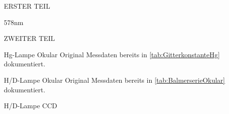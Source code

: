 \begin{appendix}
\begin{chapter}{ERSTER TEIL}
      \begin{section}{578nm}
        \label{Anhang:chp:ERSTERTEIL:sec:578}
      
      
      
      \end{section}
     
    \end{chapter}
    
    
    
    \begin{chapter}{ZWEITER TEIL}
      \label{Anhang:chp:ZWEITERTEIL}
     
     
     
      \begin{section}{Hg-Lampe Okular}
        \label{Anhang:chp:ZWEITERTEIL:sec:HgLampeOkular}
        Original Messdaten bereits in \cref{tab:GitterkonstanteHg}
        dokumentiert.
        
      \end{section}
      
     
     
      \begin{section}{H/D-Lampe Okular}
        \label{Anhang:chp:ZWEITERTEIL:sec:HDLampeOkular}
        Original Messdaten bereits in \cref{tab:BalmerserieOkular} 
        dokumentiert.
      
      \end{section}
      
     
     
      \begin{section}{H/D-Lampe CCD}
        \label{Anhang:chp:ZWEITERTEIL:sec:HDLampeCCD}
        

\end{section}
\end{chapter}
\end{appendix}
